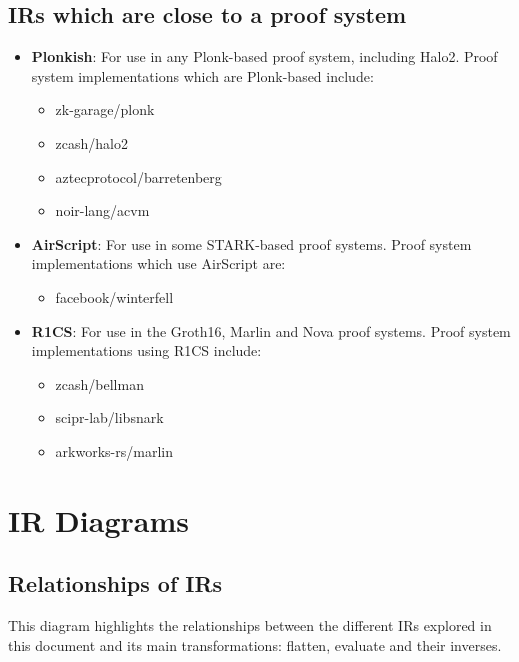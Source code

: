\documentclass[
    9pt,            %
    techreport,        %
    affiltop,       %
]{art}
\begin{document}
\subsection{IRs which are close to a proof system}
\begin{itemize}
\item \textbf{Plonkish}: For use in any Plonk-based proof system, including Halo2. Proof system implementations which are Plonk-based include: 
    \begin{itemize}
        \item zk-garage/plonk 
        \item zcash/halo2 
        \item aztecprotocol/barretenberg 
        \item noir-lang/acvm
    \end{itemize}
\item \textbf{AirScript}: For use in some STARK-based proof systems. Proof system implementations which use AirScript are: 
    \begin{itemize}
        \item facebook/winterfell
    \end{itemize}
\item \textbf{R1CS}: For use in the Groth16, Marlin and Nova proof systems. Proof system implementations using R1CS include:
    \begin{itemize}
        \item zcash/bellman
        \item scipr-lab/libsnark 
        \item arkworks-rs/marlin
    \end{itemize}
\end{itemize}

\section{IR Diagrams}

\subsection{Relationships of IRs}

This diagram highlights the relationships between the different IRs explored in this document and its main transformations: flatten, evaluate and their inverses.
\end{document}
